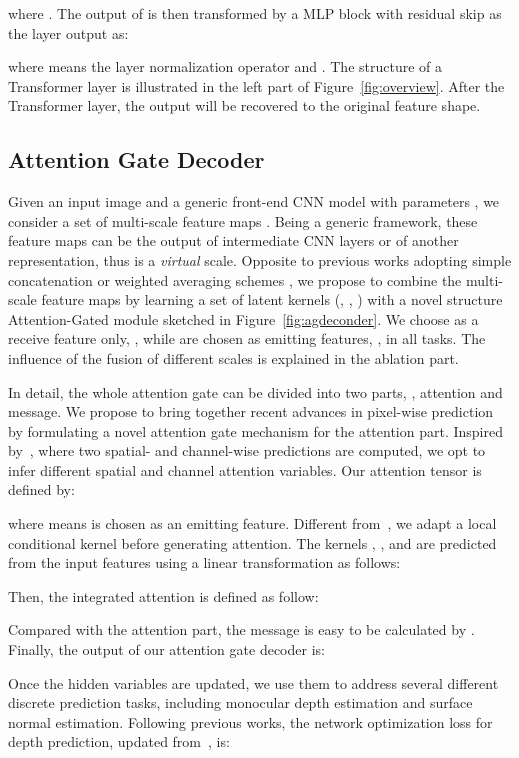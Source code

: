 \documentclass[10pt,twocolumn,letterpaper]{article}
\begin{document}
where . 
The output of  is then transformed by a MLP block with residual skip as the layer output as:

where  means the layer normalization operator and . The structure of a Transformer layer is illustrated in the left part of Figure~\ref{fig:overview}. After the Transformer layer, the output will be recovered to the original feature shape. 

\subsection{Attention Gate Decoder}
Given an input image  and a generic front-end CNN model with parameters , we consider a set of 
 multi-scale feature maps . Being a generic framework, these feature maps can 
be the output of  intermediate CNN layers or of another representation, thus  is a \textit{virtual} scale. 
Opposite to previous works adopting simple 
concatenation or weighted averaging schemes 
\cite{zheng2020rethinking}, we propose to combine the multi-scale feature maps by learning a 
set of latent kernels (, , ) with a novel structure Attention-Gated 
module sketched in Figure~\ref{fig:agdeconder}. We choose  as a receive feature only, , while  are chosen as emitting features, , in all tasks. The influence of the fusion of different scales is explained in the ablation part. 

In detail, the whole attention gate can be divided into two parts, \ie, attention and message. We propose to bring together recent advances in pixel-wise prediction by formulating a novel attention gate mechanism for the attention part. Inspired by~\cite{fu2019dual}, where two spatial- and channel-wise predictions are computed, we opt to infer different spatial and channel attention variables.
Our attention tensor is defined by:

where  means  is chosen as an emitting feature.
Different from~\cite{fu2019dual}, we adapt a local conditional kernel before generating attention. The kernels , , and  are
predicted from the input features using a linear transformation as follows:

Then, the integrated attention is defined as follow:

Compared with the attention part, the message is easy to be calculated by . Finally, the output of our attention gate decoder is:


Once the hidden variables are updated, we use them to address several different discrete prediction tasks, including monocular depth estimation and surface normal estimation. Following previous works, the network optimization loss for depth prediction, updated from~\cite{eigen2014depth}, is:
\end{document}
